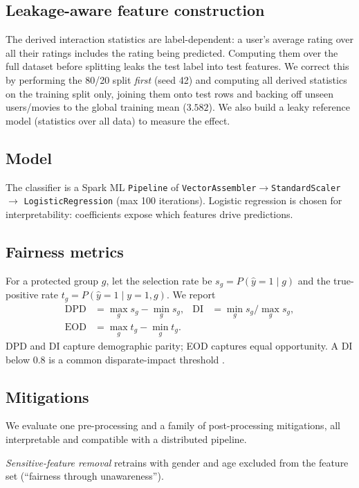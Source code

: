 \documentclass[conference]{IEEEtran}
\begin{document}
\subsection{Leakage-aware feature construction}\label{sec:leakage}
The derived interaction statistics are label-dependent: a user's average rating over
all their ratings includes the rating being predicted. Computing them over the full
dataset before splitting leaks the test label into test features. We correct this by
performing the 80/20 split \emph{first} (seed 42) and computing all derived
statistics on the training split only, joining them onto test rows and backing off
unseen users/movies to the global training mean ($3.582$). We also build a leaky
reference model (statistics over all data) to measure the effect.

\subsection{Model}
The classifier is a Spark ML \texttt{Pipeline} of
\texttt{VectorAssembler}$\rightarrow$\texttt{StandardScaler}$\rightarrow$
\texttt{LogisticRegression} (max 100 iterations). Logistic regression is chosen for
interpretability: coefficients expose which features drive predictions.

\subsection{Fairness metrics}
For a protected group $g$, let the selection rate be $s_g=P(\hat y=1\mid g)$ and the
true-positive rate $t_g=P(\hat y=1\mid y=1,g)$. We report
\begin{align}
\text{DPD} &= \max_g s_g - \min_g s_g, &
\text{DI}  &= \min_g s_g / \max_g s_g, \\
\text{EOD} &= \max_g t_g - \min_g t_g. &
\end{align}
DPD and DI capture demographic parity; EOD captures equal opportunity. A DI below
$0.8$ is a common disparate-impact threshold \cite{feldman2015certifying}.

\subsection{Mitigations}
We evaluate one pre-processing and a family of post-processing mitigations, all
interpretable and compatible with a distributed pipeline.

\emph{Sensitive-feature removal} retrains with gender and age excluded from the feature
set (``fairness through unawareness'').
\end{document}

